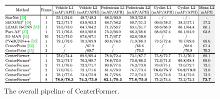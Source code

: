 \documentclass[10pt,twocolumn,letterpaper]{article}
\begin{document}
\begin{figure}[t]
    \includegraphics[width=\linewidth]{assets/experiment.png}
    \caption{\label{fig:experiment}The overall pipeline of CenterFormer.}
\end{figure}



{\small


}
\end{document}
